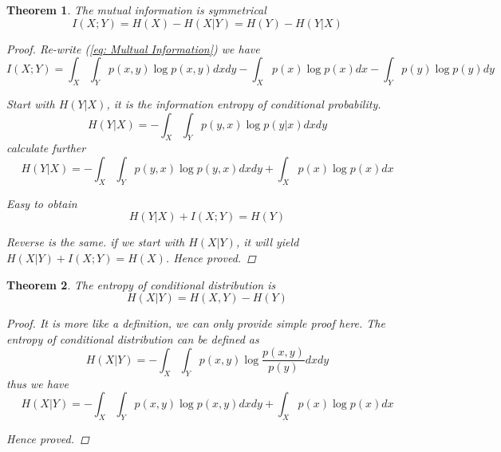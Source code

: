 \documentclass[a4paper]{article}
\newtheorem{theorem}{Theorem}[section]
\begin{document}
\begin{theorem}
    The mutual information is symmetrical
    \begin{equation}
        I(X; Y) = H(X) - H(X|Y) = H(Y) - H(Y|X)
    \end{equation}

    \begin{proof}
        Re-write (\ref{eq: Multual Information}) we have
        \begin{equation*}
            I(X; Y) = \int_{X} \int_{Y} p(x, y) \log{p(x, y)} dx dy - \int_{X} p(x) \log{p(x)} dx - \int_{Y} p(y) \log{p(y) dy}
        \end{equation*}

        Start with $H(Y|X)$, it is the information entropy of conditional probability.
        \begin{equation*}
            H(Y|X) = - \int_{X} \int_{Y} p(y, x) \log{p(y|x)} dx dy
        \end{equation*}
        calculate further
        \begin{equation*}
            H(Y|X) = - \int_{X} \int_{Y} p(y, x) \log{p(y, x)} dx dy + \int_{X} p(x) \log{p(x)} dx
        \end{equation*}

        Easy to obtain
        \begin{equation*}
            H(Y|X) + I(X; Y) = H(Y)
        \end{equation*}

        Reverse is the same.
        if we start with $H(X|Y)$, it will yield $H(X|Y) + I(X; Y) = H(X)$.
        Hence proved.
    \end{proof}

\end{theorem}

\begin{theorem}
    \label{theorem: Entropy of Conditional Distribution}
    The entropy of conditional distribution is
    \begin{equation}
        H(X|Y) = H(X, Y) - H(Y)
        \label{eq: Entropy of Conditional Distribution}
    \end{equation}

    \begin{proof}
        It is more like a definition, we can only provide simple proof here.
        The entropy of conditional distribution can be \emph{defined} as
        \begin{equation*}
            H(X|Y) = - \int_{X} \int_{Y} p(x, y) \log{\frac{p(x, y)}{p(y)}} dx dy
        \end{equation*}
        thus we have
        \begin{equation*}
            H(X|Y) = - \int_{X} \int_{Y} p(x, y) \log{p(x, y)} dx dy + \int_{X} p(x) \log{p(x)} dx
        \end{equation*}

        Hence proved.
    \end{proof}
\end{theorem}
\end{document}
